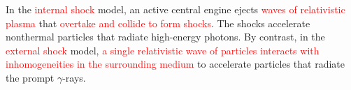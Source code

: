 \documentclass[12pt,a4paper]{article}
\begin{document}
In the \textcolor{red}{internal shock} model, an active central engine ejects \textcolor{red}{waves of relativistic plasma} that \textcolor{red}{overtake and collide to form shocks}. The shocks accelerate nonthermal particles that radiate high-energy photons. By contrast, in the \textcolor{red}{external shock} model, \textcolor{red}{a single relativistic wave of particles interacts with inhomogeneities in the surrounding medium} to accelerate particles that radiate the prompt $\gamma$-rays.
























\end{document}
